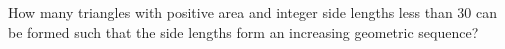 How many triangles with positive area and integer side lengths less than $30$ can be formed such that the side lengths form an increasing geometric sequence?
